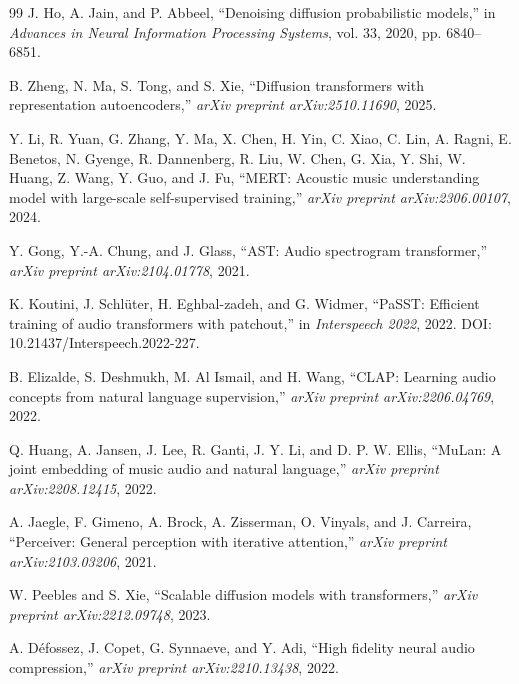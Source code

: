 \documentclass[12pt]{article}
\begin{document}
\begin{thebibliography}{99}
J. Ho, A. Jain, and P. Abbeel, ``Denoising diffusion probabilistic models,'' in \textit{Advances in Neural Information Processing Systems}, vol. 33, 2020, pp. 6840--6851.

B. Zheng, N. Ma, S. Tong, and S. Xie, ``Diffusion transformers with representation autoencoders,'' \textit{arXiv preprint arXiv:2510.11690}, 2025.

Y. Li, R. Yuan, G. Zhang, Y. Ma, X. Chen, H. Yin, C. Xiao, C. Lin, A. Ragni, E. Benetos, N. Gyenge, R. Dannenberg, R. Liu, W. Chen, G. Xia, Y. Shi, W. Huang, Z. Wang, Y. Guo, and J. Fu, ``MERT: Acoustic music understanding model with large-scale self-supervised training,'' \textit{arXiv preprint arXiv:2306.00107}, 2024.

Y. Gong, Y.-A. Chung, and J. Glass, ``AST: Audio spectrogram transformer,'' \textit{arXiv preprint arXiv:2104.01778}, 2021.

K. Koutini, J. Schlüter, H. Eghbal-zadeh, and G. Widmer, ``PaSST: Efficient training of audio transformers with patchout,'' in \textit{Interspeech 2022}, 2022. DOI: 10.21437/Interspeech.2022-227.

B. Elizalde, S. Deshmukh, M. Al Ismail, and H. Wang, ``CLAP: Learning audio concepts from natural language supervision,'' \textit{arXiv preprint arXiv:2206.04769}, 2022.

Q. Huang, A. Jansen, J. Lee, R. Ganti, J. Y. Li, and D. P. W. Ellis, ``MuLan: A joint embedding of music audio and natural language,'' \textit{arXiv preprint arXiv:2208.12415}, 2022.

A. Jaegle, F. Gimeno, A. Brock, A. Zisserman, O. Vinyals, and J. Carreira, ``Perceiver: General perception with iterative attention,'' \textit{arXiv preprint arXiv:2103.03206}, 2021.

W. Peebles and S. Xie, ``Scalable diffusion models with transformers,'' \textit{arXiv preprint arXiv:2212.09748}, 2023.

A. Défossez, J. Copet, G. Synnaeve, and Y. Adi, ``High fidelity neural audio compression,'' \textit{arXiv preprint arXiv:2210.13438}, 2022.

\end{thebibliography}
\end{document}
